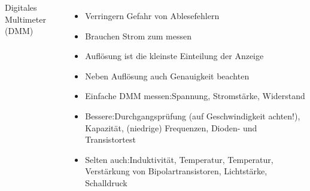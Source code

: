 \begin{frame}
\begin{columns}
\begin{center}
      {\tiny Digitales Multimeter (DMM) \href{refs}{\cite{wmde}}}
    \end{center}
    \begin{itemize}
      \item Verringern Gefahr von Ablesefehlern
      \item Brauchen Strom zum messen
      \item Auflösung ist die kleinste Einteilung der Anzeige
      \item Neben Auflösung auch Genauigkeit beachten
      \item Einfache DMM messen:\newline Spannung, Stromstärke, Widerstand
      \item Bessere:\newline Durchgangsprüfung (auf Geschwindigkeit achten!), Kapazität, (niedrige) Frequenzen, Dioden- und Transistortest
      \item Selten auch:\newline Induktivität, Temperatur, Temperatur, Verstärkung von Bipolartransistoren, Lichtstärke, Schalldruck
    \end{itemize}
  \end{columns}
\end{frame}

